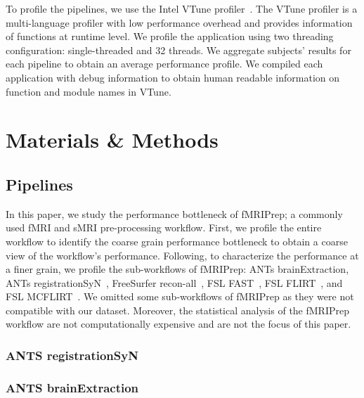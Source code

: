 \documentclass[conference]{IEEEtran}
\begin{document}
To profile the pipelines, we use the Intel VTune profiler~\cite{vtune-profiler}. The VTune profiler is a multi-language profiler with low performance overhead and provides information of functions at runtime level. We profile the application using two threading configuration: single-threaded and 32 threads. We aggregate subjects' results for each pipeline to obtain an average performance profile. We compiled each application with debug information to obtain human readable information on function and module names in VTune.

\section{Materials \& Methods}
\subsection{Pipelines}
In this paper, we study the performance bottleneck of fMRIPrep; a commonly used fMRI and sMRI pre-processing workflow. First, we profile the entire workflow to identify the coarse grain performance bottleneck to obtain a coarse view of the workflow's performance. Following, to characterize the performance at a finer grain, we profile the sub-workflows of fMRIPrep: ANTs brainExtraction, ANTs registrationSyN~\cite{Avants2008-ea}, FreeSurfer recon-all~\cite{Dale1999-wu}, FSL FAST~\cite{Zhang2001-hx}, FSL FLIRT~\cite{Jenkinson2002-od,Jenkinson2001-eu,Greve2009-dw}, and FSL MCFLIRT~\cite{Jenkinson2002-od}. We omitted some sub-workflows of fMRIPrep as they were not compatible with our dataset. Moreover, the statistical analysis of the fMRIPrep workflow are not computationally expensive and are not the focus of this paper.

\subsubsection{ANTS registrationSyN}


\subsubsection{ANTS brainExtraction}
\end{document}
